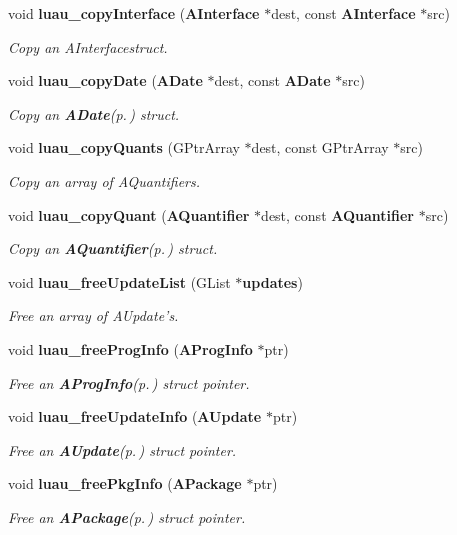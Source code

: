 \begin{CompactItemize}
void {\bf luau\_\-copy\-Interface} ({\bf AInterface} $\ast$dest, const {\bf AInterface} $\ast$src)
\begin{CompactList}\small\item\em Copy an AInterfacestruct. \item\end{CompactList}\item 
void {\bf luau\_\-copy\-Date} ({\bf ADate} $\ast$dest, const {\bf ADate} $\ast$src)
\begin{CompactList}\small\item\em Copy an {\bf ADate}{\rm (p.\,\pageref{structADate})} struct. \item\end{CompactList}\item 
void {\bf luau\_\-copy\-Quants} (GPtr\-Array $\ast$dest, const GPtr\-Array $\ast$src)
\begin{CompactList}\small\item\em Copy an array of AQuantifiers. \item\end{CompactList}\item 
void {\bf luau\_\-copy\-Quant} ({\bf AQuantifier} $\ast$dest, const {\bf AQuantifier} $\ast$src)
\begin{CompactList}\small\item\em Copy an {\bf AQuantifier}{\rm (p.\,\pageref{structAQuantifier})} struct. \item\end{CompactList}\item 
void {\bf luau\_\-free\-Update\-List} (GList $\ast${\bf updates})
\begin{CompactList}\small\item\em Free an array of AUpdate's. \item\end{CompactList}\item 
void {\bf luau\_\-free\-Prog\-Info} ({\bf AProg\-Info} $\ast$ptr)
\begin{CompactList}\small\item\em Free an {\bf AProg\-Info}{\rm (p.\,\pageref{structAProgInfo})} struct pointer. \item\end{CompactList}\item 
void {\bf luau\_\-free\-Update\-Info} ({\bf AUpdate} $\ast$ptr)
\begin{CompactList}\small\item\em Free an {\bf AUpdate}{\rm (p.\,\pageref{structAUpdate})} struct pointer. \item\end{CompactList}\item 
void {\bf luau\_\-free\-Pkg\-Info} ({\bf APackage} $\ast$ptr)
\begin{CompactList}\small\item\em Free an {\bf APackage}{\rm (p.\,\pageref{structAPackage})} struct pointer. \item\end{CompactList}\end{CompactItemize}


